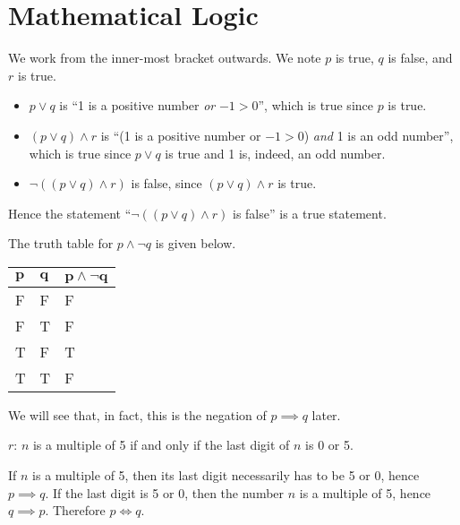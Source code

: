 \section{Mathematical Logic}
\begin{questions}
    \item We work from the inner-most bracket outwards. We note $p$ is true, $q$ is false, and $r$ is true.
    \begin{itemize}
        \item $p \lor q$ is ``1 is a positive number \textit{or} $-1 > 0$'', which is true since $p$ is true.
        \item $(p \lor q) \land r$ is ``(1 is a positive number or $-1 > 0$) \textit{and} 1 is an odd number'', which is true since $p \lor q$ is true and 1 is, indeed, an odd number.
        \item $\lnot((p \lor q) \land r)$ is false, since $(p \lor q) \land r$ is true.
    \end{itemize}
    Hence the statement ``$\lnot((p \lor q) \land r)$ is false'' is a true statement.

    \item The truth table for $p \land \lnot q$ is given below.
    \begin{table}[H]
        \centering
        \begin{tabular}{|l|l||l|}
            \hline
            $\boldsymbol{p}$ & $\boldsymbol{q}$ & $\boldsymbol{p\land \lnot q}$ \\ \hline
            F   & F   & F                  \\ \hline
            F   & T   & F                  \\ \hline
            T   & F   & T                  \\ \hline
            T   & T   & F                  \\ \hline
        \end{tabular}
    \end{table}

    We will see that, in fact, this is the negation of $p \implies q$ later.

    \item \begin{partquestions}{\roman*}
        \item $r$: $n$ is a multiple of 5 if and only if the last digit of $n$ is 0 or 5.
        \item If $n$ is a multiple of 5, then its last digit necessarily has to be 5 or 0, hence $p \implies q$. If the last digit is 5 or 0, then the number $n$ is a multiple of 5, hence $q \implies p$. Therefore $p \iff q$.
    \end{partquestions}


\end{questions}
